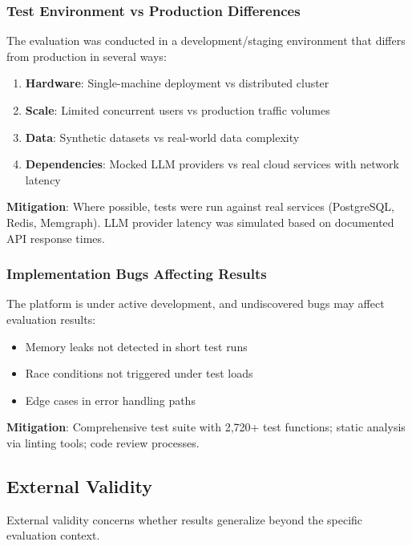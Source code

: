 \subsubsection{Test Environment vs Production Differences}

The evaluation was conducted in a development/staging environment that differs from production in several ways:

\begin{enumerate}
    \item \textbf{Hardware}: Single-machine deployment vs distributed cluster
    \item \textbf{Scale}: Limited concurrent users vs production traffic volumes
    \item \textbf{Data}: Synthetic datasets vs real-world data complexity
    \item \textbf{Dependencies}: Mocked LLM providers vs real cloud services with network latency
\end{enumerate}

\textbf{Mitigation}: Where possible, tests were run against real services (PostgreSQL, Redis, Memgraph). LLM provider latency was simulated based on documented API response times.

\subsubsection{Implementation Bugs Affecting Results}

The platform is under active development, and undiscovered bugs may affect evaluation results:

\begin{itemize}
    \item Memory leaks not detected in short test runs
    \item Race conditions not triggered under test loads
    \item Edge cases in error handling paths
\end{itemize}

\textbf{Mitigation}: Comprehensive test suite with 2,720+ test functions; static analysis via linting tools; code review processes.

\subsection{External Validity}

External validity concerns whether results generalize beyond the specific evaluation context.

